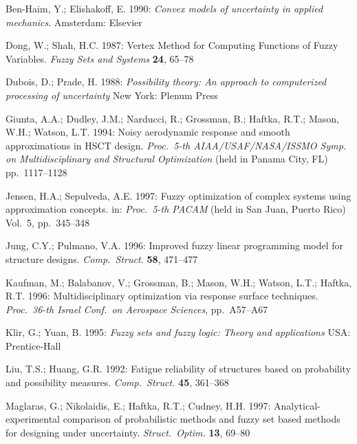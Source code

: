 \documentclass[stropt]{svjour}
\begin{document}
\begin{thebibliography}{}

Ben-Haim, Y.; Elishakoff, E. 1990:
\textit{Convex models of uncertainty in applied mechanics}.
Amsterdam: Elsevier

Dong, W.; Shah, H.C. 1987:
Vertex Method for Computing Functions of Fuzzy Variables.
\textit{Fuzzy Sets and Systems} \textbf{24}, 65--78

Dubois, D.; Prade, H. 1988:
\textit{Possibility theory: An approach to computerized processing of
uncertainty}
New York: Plenum Press

Giunta, A.A.; Dudley, J.M.; Narducci, R.; Grossman, B.;
Haftka, R.T.; Mason, W.H.; Watson, L.T. 1994:
Noisy aerodynamic response and smooth approximations in HSCT design.
\textit{Proc.\ 5-th AIAA/USAF/NASA/ISSMO Symp. on Multidisciplinary and
Structural Optimization}
(held in Panama City, FL) pp.~1117--1128

Jensen, H.A.; Sepulveda, A.E. 1997:
Fuzzy optimization of complex systems using approximation concepts.
in: \textit{Proc.\ 5-th PACAM}
(held in San Juan, Puerto Rico) Vol.\ 5, pp.~345--348

Jung, C.Y.; Pulmano, V.A. 1996:
Improved fuzzy linear programming model for structure designs.
\textit{Comp.\ Struct.} \textbf{58}, 471--477

Kaufman, M.; Balabanov, V.; Grossman, B.; Mason, W.H.;
Watson, L.T.; Haftka, R.T. 1996:
Multidisciplinary optimization via response surface techniques.
\textit{Proc.\ 36-th Israel Conf.\ on Aerospace Sciences}, pp.~A57--A67

Klir, G.; Yuan, B. 1995:
\textit{Fuzzy sets and fuzzy logic:  Theory and applications}
USA: Prentice-Hall

Liu, T.S.; Huang, G.R. 1992:
Fatigue reliability of structures based on probability and possibility
measures.
\textit{Comp.\ Struct.} \textbf{45}, 361--368

Maglaras, G.; Nikolaidis, E.; Haftka, R.T.; Cudney, H.H. 1997:
Analytical-experimental comparison of probabilistic methods and fuzzy
set based methods for designing under uncertainty.
\textit{Struct.\ Optim.} \textbf{13}, 69--80


\end{thebibliography}
\end{document}
